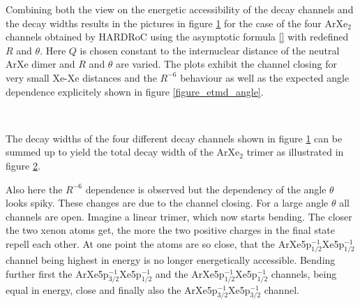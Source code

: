 Combining both the view on the energetic accessibility of the decay
channels and the decay widths results in the pictures in
figure \ref{figure:ArXe2_etmd_geom_gamma}
for the case of the four ArXe$_2$ channels obtained by \ac{HARDRoC} using the
asymptotic formula \ref{} with redefined $R$ and $\theta$. Here $Q$ is chosen constant
to the internuclear distance of the neutral ArXe dimer and $R$ and $\theta$
are varied. The plots exhibit the channel closing for very small Xe-Xe distances
and the $R^{-6}$ behaviour as well as the expected angle dependence explicitely
shown in figure \ref{figure_etmd_angle}.

\begin{figure}[h]
 \centering
 
 \\
 
 
 \caption{}
 \label{figure:ArXe2_etmd_geom_gamma}
\end{figure}

The decay widths of the four different decay channels shown in
figure \ref{figure:ArXe2_etmd_geom_gamma} can be summed up to yield
the total decay width of the ArXe$_2$ trimer as illustrated in figure
\ref{figure:ArXe2_etmd_geom_gamma_total}.

\begin{figure}[h]
 \centering
 
 \caption{}
 \label{figure:ArXe2_etmd_geom_gamma_total}
\end{figure}

Also here the $R^{-6}$ dependence is observed but the dependency
of the angle $\theta$ looks spiky. These changes are due to the channel
closing. For a large angle $\theta$ all channels are open. Imagine a linear
trimer, which now starts bending. The closer
the two xenon atoms get, the more the two positive charges in the final
state repell each other. At one point the atoms are so close, that the
ArXe5p$_{1/2}^{-1}$Xe5p$_{1/2}^{-1}$ channel being highest in energy
is no longer energetically accessible. Bending further first the
ArXe5p$_{3/2}^{-1}$Xe5p$_{1/2}^{-1}$ and the
ArXe5p$_{1/2}^{-1}$Xe5p$_{1/2}^{-1}$ channels, being equal in energy,
close and finally also the ArXe5p$_{3/2}^{-1}$Xe5p$_{3/2}^{-1}$
channel.

